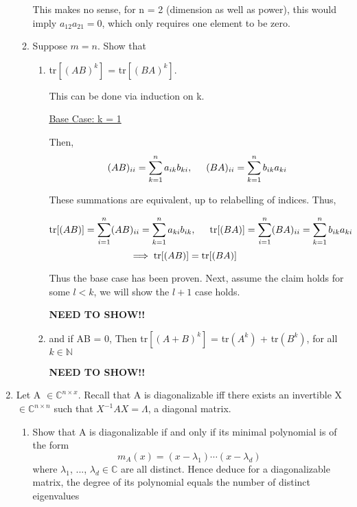 \documentclass[12pt]{article}
\newcommand{\hop}{\vspace{1mm}}
\newcommand{\jump}{\vspace{5mm}}
\newcommand{\C}{\mathbb{C}}
\newcommand{\lm}{\lambda}
\begin{document}
\begin{enumerate}[leftmargin=\labelsep]
\begin{enumerate}
\jump
This makes no sense, for n = 2 (dimension as well as power), this would imply $a_{12}a_{21} = 0$, which only requires one element to be zero.  

\hop
\item Suppose $m = n$. Show that
    \begin{enumerate}
        \item tr$[(AB)^{k}]$ = tr$[(BA)^k]$.

        \hop
        This can be done via induction on k.

        \hop \underline{Base Case: k = 1}

        \hop
        Then,
        \[
        (AB)_{ii} = \sum_{k = 1}^n a_{ik}b_{ki},
        \hspace{5mm}
        (BA)_{ii} = \sum_{k = 1}^n b_{ik}a_{ki}
        \]
        
        \hop
        These summations are equivalent, up to relabelling of indices. Thus,

        \hop
        \[
        \text{tr}[(AB)] = \sum_{i = 1}^n (AB)_{ii} = \sum_{k = 1}^n a_{ki}b_{ik},
        \hspace{5mm}
        \text{tr}[(BA)] = \sum_{i = 1}^n (BA)_{ii} = \sum_{k = 1}^n b_{ik}a_{ki}
        \]
        \[
        \hspace{-10mm}\implies \text{tr}[(AB)] = \text{tr}[(BA)]
        \]

        \hop
        Thus the base case has been proven. Next, assume the claim holds for some $l < k$, we will show the $l+1$ case holds.

        \hop
        \textbf{NEED TO SHOW!!}

        \jump
        \item and if AB = 0, Then tr$[(A+B)^k]$ = tr$(A^k)$ + tr$(B^k)$, for all $k \in \mathbb{N}$

        \hop 
        \textbf{NEED TO SHOW!!}
        
    \end{enumerate}

\end{enumerate}

\jump
\item Let A $\in \C^{n\times x}$. Recall that A is diagonalizable iff there exists an invertible X $\in \C^{n \times n}$ such that $X^{-1}AX = \Lambda$, a diagonal matrix.
\begin{enumerate}
    \item Show that A is diagonalizable if and only if its minimal polynomial is of the form 
    \[
    m_A(x) = (x - \lm_1)\cdots(x - \lm_d)
    \]
    where $\lm_1$, ..., $\lm_d \in \C$ are all distinct. Hence deduce for a diagonalizable matrix, the degree of its polynomial equals the number of distinct eigenvalues

\end{enumerate}

\end{enumerate}
\end{document}

